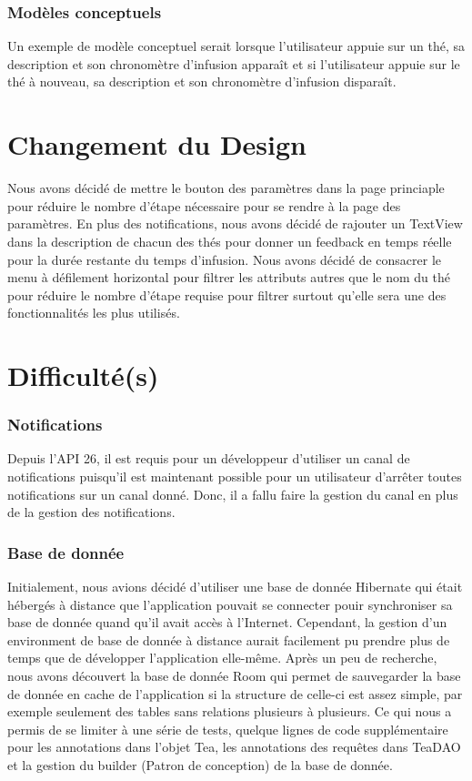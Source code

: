 \documentclass[a4paper,12pt]{article}
\begin{document}
\begin{spacing}{1}
	\subsubsection*{Modèles conceptuels}
	Un exemple de modèle conceptuel serait lorsque l'utilisateur appuie sur un thé, sa description et son chronomètre d'infusion apparaît et si l'utilisateur appuie sur le thé à nouveau, sa description et son chronomètre d'infusion disparaît.
	\section*{Changement du Design}
	Nous avons décidé de mettre le bouton des paramètres dans la page princiaple pour réduire le nombre d'étape nécessaire pour se rendre à la page des paramètres. En plus des notifications, nous avons décidé de rajouter un TextView dans la description de chacun des thés pour donner un feedback en temps réelle pour la durée restante du temps d'infusion. Nous avons décidé de consacrer le menu à défilement horizontal pour filtrer les attributs autres que le nom du thé pour réduire le nombre d'étape requise pour filtrer surtout qu'elle sera une des fonctionnalités les plus utilisés.
	\section*{Difficulté(s)}
	\subsubsection*{Notifications}
	Depuis l'API 26, il est requis pour un développeur d'utiliser un canal de notifications puisqu'il est maintenant possible pour un utilisateur d'arrêter toutes notifications sur un canal donné. Donc, il a fallu faire la gestion du canal en plus de la gestion des notifications.
	\subsubsection*{Base de donnée}
	Initialement, nous avions décidé d'utiliser une base de donnée Hibernate qui était hébergés à distance que l'application pouvait se connecter pouir synchroniser sa base de donnée quand qu'il avait accès à l'Internet. Cependant, la gestion d'un environment de base de donnée à distance aurait facilement pu prendre plus de temps que de développer l'application elle-même. Après un peu de recherche, nous avons découvert la base de donnée Room qui permet de sauvegarder la base de donnée en cache de l'application si la structure de celle-ci est assez simple, par exemple seulement des tables sans relations plusieurs à plusieurs. Ce qui nous a permis de se limiter à une série de tests, quelque lignes de code supplémentaire pour les annotations dans l'objet Tea, les annotations des requêtes dans TeaDAO et la gestion du builder (Patron de conception) de la base de donnée.

\end{spacing}
\end{document}
